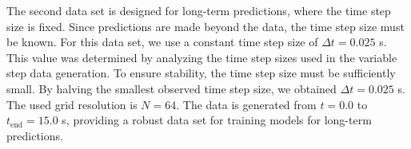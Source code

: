 The second data set is designed for long-term predictions, where the time step size is fixed.
Since predictions are made beyond the data, the time step size must be known.
For this data set, we use a constant time step size of $\Delta t = 0.025$ s.
This value was determined by analyzing the time step sizes used in the variable step data generation.
To ensure stability, the time step size must be sufficiently small.
By halving the smallest observed time step size, we obtained $\Delta t = 0.025$ s.
The used grid resolution is $N = 64$.
The data is generated from $t = 0.0$ to $t_{\text{end}} = 15.0$ s, providing a robust data set for training models for long-term predictions.

